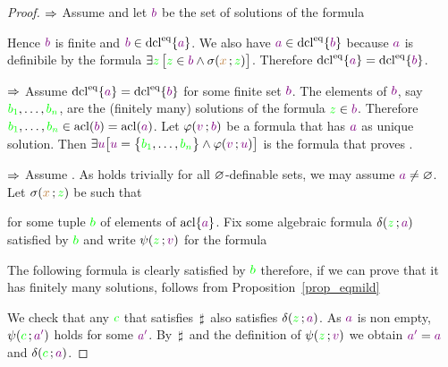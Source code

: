\documentclass[creche.tex]{subfiles}
\begin{document}
\begin{proof}$\Rightarrow$ Assume  and let ${\color{violet} b}$ be the set of solutions of the formula


Hence ${\color{violet} b}$ is finite and ${\color{violet} b}\in\mathop{\rm dcl}^{{\rm eq}}\{{\color{violet} a}\}$. We also have ${\color{violet} a}\in\mathop{\rm dcl}^{{\rm eq}}\{{\color{violet} b}\}$ because ${\color{violet} a}$ is definibile by the formula $\exists{\color{green}z}\,\big[{\color{green} z}\in {\color{violet}b}\wedge \sigma({\color{brown} x}\,;{\color{green} z})\big]$. Therefore $\mathop{\rm dcl}^{{\rm eq}}\{{\color{violet} a}\}=\mathop{\rm dcl}^{{\rm eq}}\{{\color{violet} b}\}$. 


$\Rightarrow$ Assume $\mathop{\rm dcl}^{{\rm eq}}\{{\color{violet} a}\}=\mathop{\rm dcl}^{{\rm eq}}\{{\color{violet} b}\}$ for some finite set ${\color{violet} b}$. The elements of ${\color{violet} b}$, say ${\color{green} b_1},\dots,{\color{green} b_n}$, are the (finitely many) solutions of the formula ${\color{green} z}\in{\color{violet}b}$. Therefore ${\color{green} b_1},\dots,{\color{green} b_n}\in\mathop{\rm acl}({\color{violet} b})=\mathop{\rm acl}({\color{violet} a})$. Let $\varphi({\color{violet} v}\,;{\color{violet} b})$ be a formula that has ${\color{violet} a}$ as unique solution. Then $\exists{\color{violet}u} \big[{\color{violet} u}=\big\{{\color{green} b_1},\dots,{\color{green} b_n}\big\}\wedge \varphi({\color{violet} v}\,;{\color{violet} u})\big]$ is the formula that proves .

$\Rightarrow$ Assume . As  holds trivially for all $\varnothing$-definable sets, we may assume ${\color{violet} a}\neq\varnothing$. Let $\sigma({\color{brown} x}\,;{\color{green} z})$ be such that


for some tuple ${\color{green} b}$ of elements of $\mathop{\rm acl}\{{\color{violet} a}\}$.  Fix some algebraic formula $\delta({\color{green} z}\,;{\color{violet} a})$ satisfied by  ${\color{green} b}$ and write $\psi({\color{green} z}\,;{\color{violet} v})$ for the formula


The following formula is clearly satisfied by ${\color{green} b}$ therefore, if we can prove that it has finitely many solutions,  follows from Proposition~\ref{prop_eqmild}


We check that any ${\color{green} c}$ that satisfies $\,\sharp\,$ also satisfies $\delta({\color{green} z}\,;{\color{violet} a})$. As ${\color{violet} a}$ is non empty, $\psi({\color{green} c}\,;{\color{violet} a'})$ holds for some ${\color{violet} a'}$. By $\,\sharp\,$ and the definition of $\psi({\color{green} z}\,;{\color{violet} v})$ we obtain ${\color{violet} a'}={\color{violet} a}$ and  $\delta({\color{green} c}\,;{\color{violet} a})$.
\end{proof}
\end{document}
